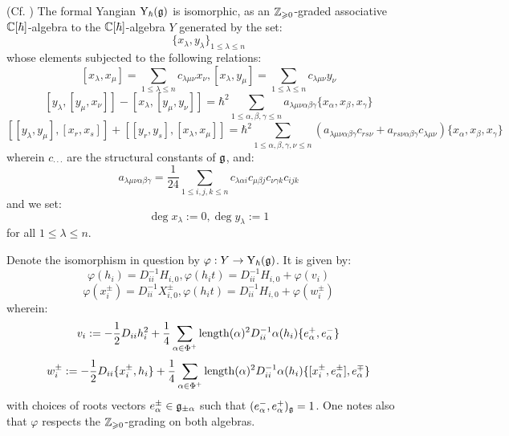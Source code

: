         \begin{theorem} \label{theorem: drinfeld_current_presentation}
            (Cf. \cite[Theorem 12.1.3]{chari_pressley_quantum_groups}) The formal Yangian $\mathrm{Y}_{\hbar}(\mathfrak{g})$ is isomorphic, as an $\mathbb{Z}_{\geqslant 0}$-graded associative $\mathbb{C}[\hbar]$-algebra to the $\mathbb{C}[\hbar]$-algebra $Y$ generated by the set:
                $$\{ x_{\lambda}, y_{\lambda} \}_{1 \leq \lambda \leq n}$$
            whose elements subjected to the following relations:
                $$[ x_{\lambda}, x_{\mu} ] = \sum_{1 \leq \lambda \leq n} c_{\lambda \mu \nu} x_{\nu}, [ x_{\lambda}, y_{\mu} ] = \sum_{1 \leq \lambda \leq n} c_{\lambda \mu \nu} y_{\nu}$$
                $$[ y_{\lambda}, [y_{\mu}, x_{\nu}] ] - [ x_{\lambda}, [y_{\mu}, y_{\nu}] ] = \hbar^2 \sum_{1 \leq \alpha, \beta, \gamma \leq n} a_{\lambda \mu \nu \alpha \beta \gamma} \{ x_{\alpha}, x_{\beta}, x_{\gamma} \}$$
                $$[ [y_{\lambda}, y_{\mu}], [x_r, x_s] ] + [ [y_r, y_s], [x_{\lambda}, x_{\mu}] ] = \hbar^2 \sum_{1 \leq \alpha, \beta, \gamma, \nu \leq n} ( a_{\lambda \mu \nu \alpha \beta \gamma} c_{r s \nu} + a_{r s \nu \alpha \beta \gamma} c_{\lambda \mu \nu} ) \{ x_{\alpha}, x_{\beta}, x_{\gamma} \}$$
            wherein $c_{\cdot \cdot \cdot}$ are the structural constants of $\mathfrak{g}$, and:
                $$a_{\lambda \mu \nu \alpha \beta \gamma} = \frac{1}{24} \sum_{1 \leq i, j, k \leq n} c_{\lambda \alpha i} c_{\mu \beta j} c_{\nu \gamma k} c_{i j k}$$
            and we set:
                $$\deg x_{\lambda} := 0, \deg y_{\lambda} := 1$$
            for all $1 \leq \lambda \leq n$.
            
            Denote the isomorphism in question by $\varphi: Y \to \mathrm{Y}_{\hbar}(\mathfrak{g})$. It is given by:
                $$\varphi(h_i) = D_{ii}^{-1} H_{i, 0}, \varphi(h_i t) = D_{ii}^{-1} H_{i, 0} + \varphi(v_i)$$
                $$\varphi(x_i^{\pm}) = D_{ii}^{-1} X_{i, 0}^{\pm}, \varphi(h_i t) = D_{ii}^{-1} H_{i, 0} + \varphi(w_i^{\pm})$$
            wherein:
                $$v_i := -\frac12 D_{ii} h_i^2 + \frac14 \sum_{\alpha \in \Phi^+} \operatorname{length}(\alpha)^2 D_{ii}^{-1} \alpha(h_i) \{e_{\alpha}^+, e_{\alpha}^-\}$$
                $$w_i^{\pm} := -\frac12 D_{ii} \{x_i^{\pm}, h_i\} + \frac14 \sum_{\alpha \in \Phi^+} \operatorname{length}(\alpha)^2 D_{ii}^{-1} \alpha(h_i) \{[x_i^{\pm}, e_{\alpha}^{\pm}], e_{\alpha}^{\mp}\}$$
            with choices of roots vectors $e_{\alpha}^{\pm} \in \mathfrak{g}_{\pm \alpha}$ such that $(e_{\alpha}^-, e_{\alpha}^+)_{\mathfrak{g}} = 1$. One notes also that $\varphi$ respects the $\mathbb{Z}_{\geqslant 0}$-grading on both algebras.
        \end{theorem}

